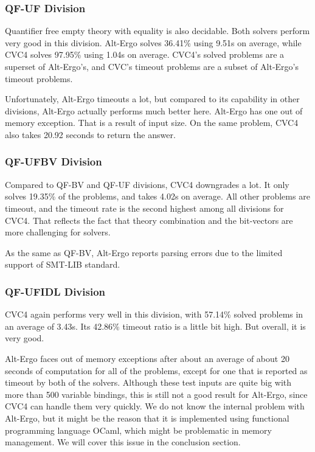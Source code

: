\documentclass[10pt,letter]{article}
\theoremstyle{definition}
\begin{document}
\subsubsection{QF-UF Division}

Quantifier free empty theory with equality is also decidable. Both solvers perform very good in this division. Alt-Ergo solves 36.41\% using 9.51s on average, while CVC4 solves 97.95\% using 1.04s on average. CVC4's solved problems are a superset of Alt-Ergo's, and CVC's timeout problems are a subset of Alt-Ergo's timeout problems.

Unfortunately, Alt-Ergo timeouts a lot, but compared to its capability in other divisions, Alt-Ergo actually performs much better here. Alt-Ergo has one out of memory exception. That is a result of input size. On the same problem, CVC4 also takes 20.92 seconds to return the answer.

\subsubsection{QF-UFBV Division}

Compared to QF-BV and QF-UF divisions, CVC4 downgrades a lot. It only solves 19.35\% of the problems, and takes 4.02s on average. All other problems are timeout, and the timeout rate is the second highest among all divisions for CVC4. That reflects the fact that theory combination and the bit-vectors are more challenging for solvers.

As the same as QF-BV, Alt-Ergo reports parsing errors due to the limited support of SMT-LIB standard.

\subsubsection{QF-UFIDL Division}

CVC4 again performs very well in this division, with 57.14\% solved problems in an average of 3.43s. Its 42.86\% timeout ratio is a little bit high. But overall, it is very good.

Alt-Ergo faces out of memory exceptions after about an average of about 20 seconds of computation for all of the problems, except for one that is reported as timeout by both of the solvers. Although these test inputs are quite big with more than 500 variable bindings, this is still not a good result for Alt-Ergo, since CVC4 can handle them very quickly. We do not know the internal problem with Alt-Ergo, but it might be the reason that it is implemented using functional programming language OCaml, which might be problematic in memory management. We will cover this issue in the conclusion section. 
\end{document}
